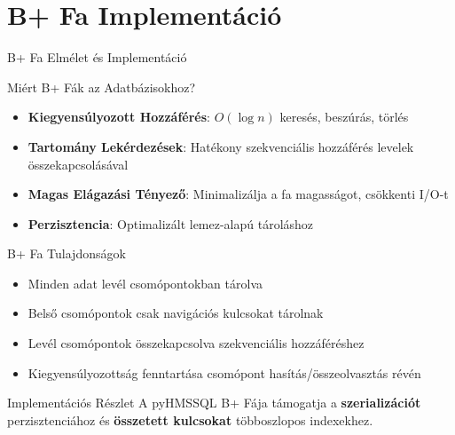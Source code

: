 \documentclass[aspectratio=169]{beamer}
\begin{document}
\section{B+ Fa Implementáció}

\begin{frame}{B+ Fa Elmélet és Implementáció}
\begin{block}{Miért B+ Fák az Adatbázisokhoz?}
\begin{itemize}
    \item \textbf{Kiegyensúlyozott Hozzáférés}: $O(\log n)$ keresés, beszúrás, törlés
    \item \textbf{Tartomány Lekérdezések}: Hatékony szekvenciális hozzáférés levelek összekapcsolásával
    \item \textbf{Magas Elágazási Tényező}: Minimalizálja a fa magasságot, csökkenti I/O-t
    \item \textbf{Perzisztencia}: Optimalizált lemez-alapú tároláshoz
\end{itemize}
\end{block}

\begin{block}{B+ Fa Tulajdonságok}
\begin{itemize}
    \item Minden adat levél csomópontokban tárolva
    \item Belső csomópontok csak navigációs kulcsokat tárolnak
    \item Levél csomópontok összekapcsolva szekvenciális hozzáféréshez
    \item Kiegyensúlyozottság fenntartása csomópont hasítás/összeolvasztás révén
\end{itemize}
\end{block}

\begin{alertblock}{Implementációs Részlet}
A pyHMSSQL B+ Fája támogatja a \textbf{szerializációt} perzisztenciához és \textbf{összetett kulcsokat} többoszlopos indexekhez.
\end{alertblock}
\end{frame}
\end{document}
